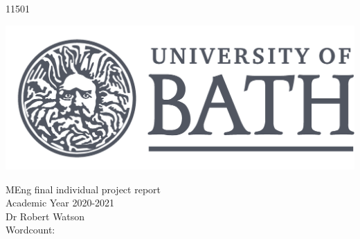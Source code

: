 \begin{titlepage}
	\begin{center}
	\vspace*{2cm}
	\Huge
	\textbf{\thetitle}\\
	\vspace{2cm}
	\LARGE
	\textsc{\textbf{\theauthor}}\\
	11501
	
	\vspace{2cm}
	
	\includegraphics{../figures/uob_logo_high_res}
	
	\vspace{3cm}
	
	MEng final individual project report\\
	\vfill
	Academic Year 2020-2021\\
	Dr Robert Watson\\
	
	Wordcount: 
	\end{center}
	
\end{titlepage}

